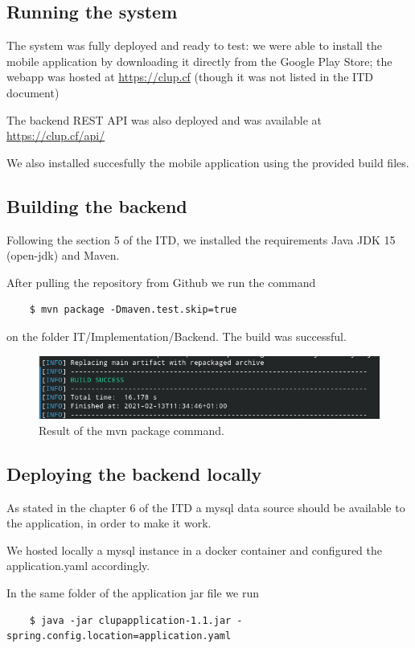 \subsection{Running the system}

The system was fully deployed and ready to test: we were able to install the mobile application by downloading it directly from the Google Play Store; the webapp was hosted at \href{https://clup.cf}{https://clup.cf} (though it was not listed in the ITD document)

The backend REST API was also deployed and was available at \href{https://clup.cf/api/}{https://clup.cf/api/}

We also installed succesfully the mobile application using the provided build files.

\subsection{Building the backend}

Following the section 5 of the ITD, we installed the requirements Java JDK 15 (open-jdk) and Maven.

After pulling the repository from Github we run the command
\begin{lstlisting}
    $ mvn package -Dmaven.test.skip=true
\end{lstlisting}
on the folder IT/Implementation/Backend. The build was successful.
\begin{figure}[ht]
    \centering
    \includegraphics[width=\textwidth]{Images/package.jpg}
    \caption{\label{fig:Booked_Ticket_State}Result of the mvn package command.}
\end{figure}

\subsection{Deploying the backend locally}
As stated in the chapter 6 of the ITD a mysql data source should be available to the application, in order to make it work.

We hosted locally a mysql instance in a docker container and configured the application.yaml accordingly.


In the same folder of the application jar file we run
\begin{lstlisting}
    $ java -jar clupapplication-1.1.jar -spring.config.location=application.yaml
\end{lstlisting}

